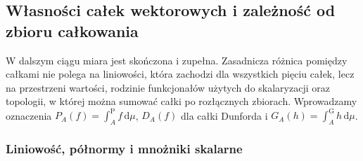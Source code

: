 \subsection{Własności całek wektorowych i zależność od zbioru całkowania}

W dalszym ciągu miara jest skończona i zupełna. Zasadnicza
różnica pomiędzy całkami nie polega na liniowości, która
zachodzi dla wszystkich pięciu całek, lecz na przestrzeni
wartości, rodzinie funkcjonałów użytych do skalaryzacji
oraz topologii, w której można sumować całki po rozłącznych
zbiorach. Wprowadzamy oznaczenia $P_A(f)=\int_A^{\mathrm P}f\,\mathrm d\mu$,
$D_A(f)$ dla całki Dunforda i $G_A(h)=\int_A^{\mathrm G}h\,\mathrm d\mu$.

\subsubsection{Liniowość, półnormy i mnożniki skalarne}


